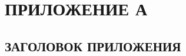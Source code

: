 

\chapter*{ПРИЛОЖЕНИЕ А}\label{toc:attachment-a}
\titleformat{\section}{\bigsize\centering\bfseries}{\thesection}{}{}{}{}
\section*{ЗАГОЛОВОК ПРИЛОЖЕНИЯ}
